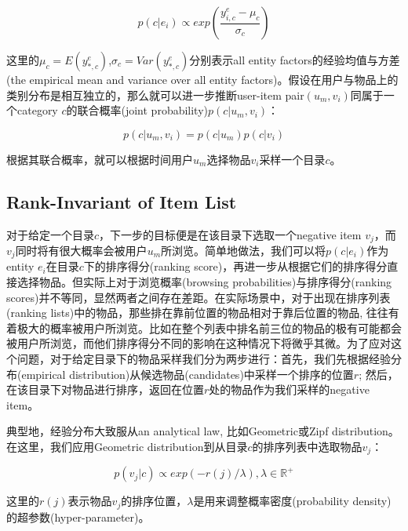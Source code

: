 \begin{equation}
p\left(c|e_i\right)  \propto exp\left( \frac {y_{i,c}^e - \mu_c}{\sigma_c} \right)
\end{equation}

这里的$\mu_c = E\left(y_{*,c}^e\right)$,$\sigma_c = Var\left(y_{*,c}^e\right)$分别表示all entity factors的经验均值与方差(the empirical mean and variance over all entity factors)。假设在用户与物品上的类别分布是相互独立的，那么就可以进一步推断user-item pair$\left(u_m,v_i\right)$同属于一个category $c$的联合概率(joint probability)$p\left(c|u_m,v_i\right)$：

\begin{equation}
\label{eq21}
p\left(c|u_m,v_i\right) = p\left(c|u_m\right)p\left(c|v_i\right)
\end{equation}

根据其联合概率，就可以根据时间用户$u_m$选择物品$v_i$采样一个目录$c$。




\subsection{Rank-Invariant of Item List}
对于给定一个目录$c$，下一步的目标便是在该目录下选取一个negative item $v_j$，而$v_j$同时将有很大概率会被用户$u_m$所浏览。简单地做法，我们可以将$p\left(c|e_i\right)$作为entity $e_i$在目录$c$下的排序得分(ranking score)，再进一步从根据它们的排序得分直接选择物品。但实际上对于浏览概率(browsing probabilities)与排序得分(ranking scores)并不等同，显然两者之间存在差距。在实际场景中，对于出现在排序列表(ranking lists)中的物品，那些排在靠前位置的物品相对于靠后位置的物品, 往往有着极大的概率被用户所浏览。比如在整个列表中排名前三位的物品的极有可能都会被用户所浏览，而他们排序得分不同的影响在这种情况下将微乎其微。为了应对这个问题，对于给定目录下的物品采样我们分为两步进行：首先，我们先根据经验分布(empirical distribution)从候选物品(candidates)中采样一个排序的位置$r$; 然后，在该目录下对物品进行排序，返回在位置$r$处的物品作为我们采样的negative item。

典型地，经验分布大致服从an analytical law, 比如Geometric\cite{wang2009pskip}或Zipf\cite{adamic2002zipf} distribution。在这里，我们应用Geometric distribution到从目录$c$的排序列表中选取物品$v_j$：

\begin{equation}
\label{eq22}
p\left(v_j|c\right) \propto exp\left(-r\left(j\right)/\lambda\right),\lambda \in \mathbb{R}^+
\end{equation}

这里的$r\left(j\right)$表示物品$v_j$的排序位置，$\lambda$是用来调整概率密度(probability density)的超参数(hyper-parameter)。




